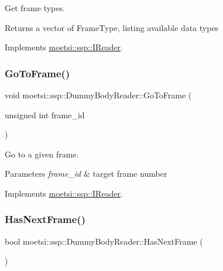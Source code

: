 Get frame types. 

\begin{DoxyReturn}{Returns}
a vector of Frame\+Type, listing available data types 
\end{DoxyReturn}


Implements \hyperlink{classmoetsi_1_1ssp_1_1IReader_a4116c1931fde7bd66133934ffdca1cce}{moetsi\+::ssp\+::\+I\+Reader}.

\mbox{\label{classmoetsi_1_1ssp_1_1DummyBodyReader_a61e495deb7314560d5e17388f6b6938f}} 
\subsubsection{\texorpdfstring{Go\+To\+Frame()}{GoToFrame()}}
{\footnotesize\ttfamily void moetsi\+::ssp\+::\+Dummy\+Body\+Reader\+::\+Go\+To\+Frame (\begin{DoxyParamCaption}\item[{unsigned int}]{frame\+\_\+id }\end{DoxyParamCaption})\hspace{0.3cm}{\ttfamily [virtual]}}



Go to a given frame. 


\begin{DoxyParams}{Parameters}
{\em frame\+\_\+id} & target frame number \\
\hline
\end{DoxyParams}


Implements \hyperlink{classmoetsi_1_1ssp_1_1IReader_a6f1be3c06538992cca6d550bd9566681}{moetsi\+::ssp\+::\+I\+Reader}.

\mbox{\label{classmoetsi_1_1ssp_1_1DummyBodyReader_ab91b3c2ccdba21bae040340c34361595}} 
\subsubsection{\texorpdfstring{Has\+Next\+Frame()}{HasNextFrame()}}
{\footnotesize\ttfamily bool moetsi\+::ssp\+::\+Dummy\+Body\+Reader\+::\+Has\+Next\+Frame (\begin{DoxyParamCaption}{ }\end{DoxyParamCaption})\hspace{0.3cm}{\ttfamily [virtual]}}



